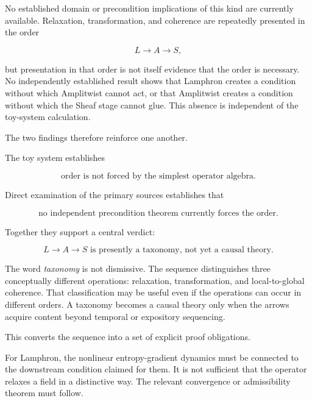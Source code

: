 \documentclass[11pt]{article}
\begin{document}
No established domain or precondition implications of this kind are currently available. Relaxation, transformation, and coherence are repeatedly presented in the order

\begin{equation}
L\to A\to S,
\end{equation}

but presentation in that order is not itself evidence that the order is necessary. No independently established result shows that Lamphron creates a condition without which Amplitwist cannot act, or that Amplitwist creates a condition without which the Sheaf stage cannot glue. This absence is independent of the toy-system calculation.

The two findings therefore reinforce one another.

The toy system establishes

\begin{equation}
\boxed{
\text{order is not forced by the simplest operator algebra}.
}
\end{equation}

Direct examination of the primary sources establishes that

\begin{equation}
\boxed{
\text{no independent precondition theorem currently forces the order}.
}
\end{equation}

Together they support a central verdict:

\begin{equation}
\boxed{
L\to A\to S
\text{ is presently a taxonomy, not yet a causal theory}.
}
\end{equation}

The word \emph{taxonomy} is not dismissive. The sequence distinguishes three conceptually different operations: relaxation, transformation, and local-to-global coherence. That classification may be useful even if the operations can occur in different orders. A taxonomy becomes a causal theory only when the arrows acquire content beyond temporal or expository sequencing.

This converts the sequence into a set of explicit proof obligations.

For Lamphron, the nonlinear entropy-gradient dynamics must be connected to the downstream condition claimed for them. It is not sufficient that the operator relaxes a field in a distinctive way. The relevant convergence or admissibility theorem must follow.
\end{document}
